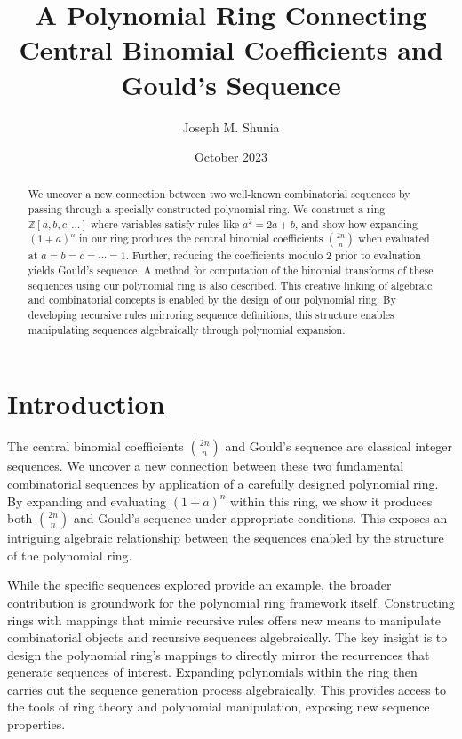 \documentclass{article}
\theoremstyle{plain}
\theoremstyle{definition}
\begin{document}
\title{A Polynomial Ring Connecting Central Binomial Coefficients and Gould's Sequence}
\author{Joseph M. Shunia}
\date{October 2023}
\maketitle

\begin{abstract}
We uncover a new connection between two well-known combinatorial sequences by passing through a specially constructed polynomial ring. We construct a ring $\mathbb{Z}[a,b,c,\ldots]$ where variables satisfy rules like $a^2 = 2a + b$, and show how expanding $(1+a)^n$ in our ring produces the central binomial coefficients $\binom{2n}{n}$ when evaluated at $a=b=c=\cdots=1$. Further, reducing the coefficients modulo $2$ prior to evaluation yields Gould's sequence. A method for computation of the binomial transforms of these sequences using our polynomial ring is also described. This creative linking of algebraic and combinatorial concepts is enabled by the design of our polynomial ring. By developing recursive rules mirroring sequence definitions, this structure enables manipulating sequences algebraically through polynomial expansion. 
\end{abstract}

\section{Introduction}
The central binomial coefficients $\binom{2n}{n}$ \cite{A000984} and Gould's sequence \cite{A001316} are classical integer sequences. We uncover a new connection between these two fundamental combinatorial sequences by application of a carefully designed polynomial ring. By expanding and evaluating $(1+a)^n$ within this ring, we show it produces both $\binom{2n}{n}$ and Gould's sequence under appropriate conditions. This exposes an intriguing algebraic relationship between the sequences enabled by the structure of the polynomial ring.

While the specific sequences explored provide an example, the broader contribution is groundwork for the polynomial ring framework itself. Constructing rings with mappings that mimic recursive rules offers new means to manipulate combinatorial objects and recursive sequences algebraically. The key insight is to design the polynomial ring's mappings to directly mirror the recurrences that generate sequences of interest. Expanding polynomials within the ring then carries out the sequence generation process algebraically. This provides access to the tools of ring theory and polynomial manipulation, exposing new sequence properties.
\end{document}

